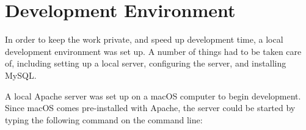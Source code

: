 \documentclass[12pt,openany,a4paper]{book}
\newcommand{\tab}[1]  {Table~\ref{#1}}		%
\begin{document}







\section{Development Environment}

In order to keep the work private, and speed up development time, a local development
environment was set up. A number of things had to be taken care of, including
setting up a local server, configuring the server, and installing MySQL.

A local Apache server was set up on a macOS computer to begin development. Since
macOS comes pre-installed with Apache, the server could be started by typing the
following command on the command line:
\end{document}

